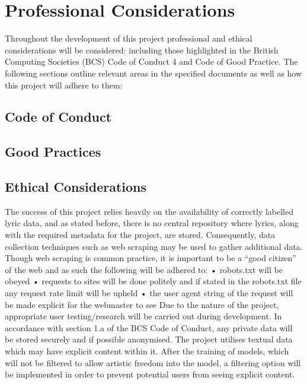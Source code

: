 \chapter{Professional Considerations}
\label{prof_con}
Throughout the development of this project professional and ethical considerations will be considered: including those highlighted in the British Computing Societies (BCS) Code of Conduct 4 and Code of Good Practice. The following sections outline relevant areas in the specified documents as well as how this project will adhere to them:
\section{Code of Conduct}
\section{Good Practices}
\section{Ethical Considerations}
The success of this project relies heavily on the availability of correctly labelled lyric data, and as stated before, there is no central repository where lyrics, along with the required metadata for the project, are stored. Consequently, data collection techniques such as web scraping may be used
to gather additional data.
Though web scraping is common practice, it is important to be a “good citizen” of the web and as such the following will be adhered to:
• robots.txt will be obeyed
• requests to sites will be done politely and if stated in the robots.txt file any request rate
limit will be upheld
• the user agent string of the request will be made explicit for the webmaster to see
Due to the nature of the project, appropriate user testing/research will be carried out during development. In accordance with section 1.a of the BCS Code of Conduct, any private data will be stored securely and if possible anonymised.
The project utilises textual data which may have explicit content within it. After the training of models, which will not be filtered to allow artistic freedom into the model, a filtering option will be implemented in order to prevent potential users from seeing explicit content.